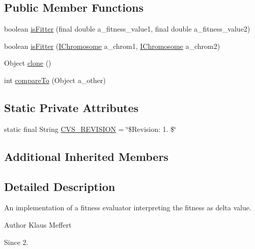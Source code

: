 \subsection*{Public Member Functions}
\begin{DoxyCompactItemize}
\item 
boolean \hyperlink{classorg_1_1jgap_1_1_delta_fitness_evaluator_a5662e555bf3272007d6ba5bfa15c7a45}{is\-Fitter} (final double a\-\_\-fitness\-\_\-value1, final double a\-\_\-fitness\-\_\-value2)
\item 
boolean \hyperlink{classorg_1_1jgap_1_1_delta_fitness_evaluator_ab0b04bde3d5a8e994618e770996d0a6e}{is\-Fitter} (\hyperlink{interfaceorg_1_1jgap_1_1_i_chromosome}{I\-Chromosome} a\-\_\-chrom1, \hyperlink{interfaceorg_1_1jgap_1_1_i_chromosome}{I\-Chromosome} a\-\_\-chrom2)
\item 
Object \hyperlink{classorg_1_1jgap_1_1_delta_fitness_evaluator_a5f1f1b82f83537580d943319439839e7}{clone} ()
\item 
int \hyperlink{classorg_1_1jgap_1_1_delta_fitness_evaluator_a782f104e9b20a75a3a7c64f8fbf9bd34}{compare\-To} (Object a\-\_\-other)
\end{DoxyCompactItemize}
\subsection*{Static Private Attributes}
\begin{DoxyCompactItemize}
\item 
static final String \hyperlink{classorg_1_1jgap_1_1_delta_fitness_evaluator_a4a930595e0314fd128afb292a5682094}{C\-V\-S\-\_\-\-R\-E\-V\-I\-S\-I\-O\-N} = \char`\"{}\$Revision\-: 1. \$\char`\"{}
\end{DoxyCompactItemize}
\subsection*{Additional Inherited Members}


\subsection{Detailed Description}
An implementation of a fitness evaluator interpreting the fitness as delta value.

\begin{DoxyAuthor}{Author}
Klaus Meffert 
\end{DoxyAuthor}
\begin{DoxySince}{Since}
2. 
\end{DoxySince}


